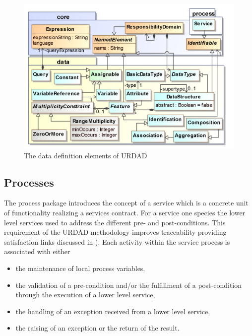 \begin{figure}
  \centering
  \includegraphics{data}
  \caption{The data definition elements of URDAD}
  \label{fig:metamodel}
\end{figure}


\subsection{Processes}

The process package introduces the concept of a service which is a concrete unit of functionality realizing a services contract. For a service one species the lower level services used to address the different pre- and post-conditions. This requirement of the URDAD methodology improves traceability providing satisfaction links discussed in \cite{ramesh_toward_2001}). Each activity within the service process is associated with either
  \begin{itemize}
    \item the maintenance of local process variables,
    \item the validation of a pre-condition and/or the fulfillment of a post-condition through the execution of a lower level service,
    \item the handling of an exception received from a lower level service,
    \item the raising of an exception or the return of the result.
  \end{itemize}

